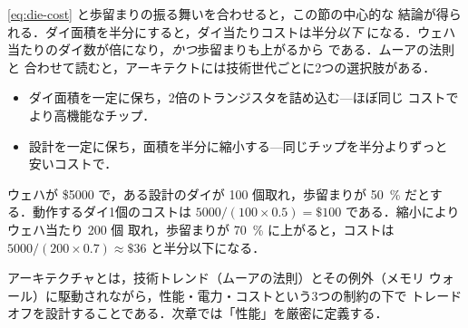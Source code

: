 \documentclass[../main.tex]{subfiles}
\begin{document}
\cref{eq:die-cost} と歩留まりの振る舞いを合わせると，この節の中心的な
結論が得られる．ダイ面積を半分にすると，ダイ当たりコストは半分\emph{以下}
になる．ウェハ当たりのダイ数が倍になり，\emph{かつ}歩留まりも上がるから
である．ムーアの法則と
合わせて読むと，アーキテクトには技術世代ごとに2つの選択肢がある．
\begin{itemize}
  \item ダイ面積を一定に保ち，2倍のトランジスタを詰め込む---ほぼ同じ
    コストでより高機能なチップ．
  \item 設計を一定に保ち，面積を半分に縮小する---同じチップを半分よりずっと
    安いコストで．
\end{itemize}

\begin{example}
  ウェハが \$5000 で，ある設計のダイが 100 個取れ，歩留まりが
  \SI{50}{\percent} だとする．動作するダイ1個のコストは
  $5000/(100\times 0.5) = \$100$ である．縮小によりウェハ当たり 200 個
  取れ，歩留まりが \SI{70}{\percent} に上がると，コストは
  $5000/(200\times 0.7) \approx \$36$ と半分以下になる．
\end{example}

\begin{keypoint}[章のまとめ]
  アーキテクチャとは，技術トレンド（ムーアの法則）とその例外（メモリ
  ウォール）に駆動されながら，性能・電力・コストという3つの制約の下で
  トレードオフを設計することである．次章では「性能」を厳密に定義する．
\end{keypoint}
\end{document}
